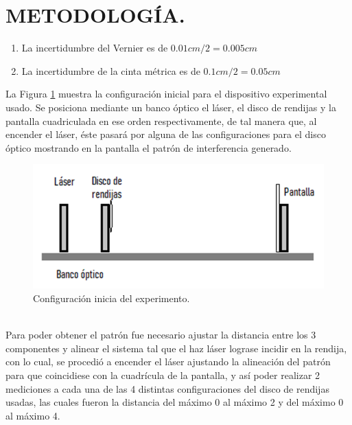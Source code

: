 \documentclass[12pt,a4paper]{article}
\begin{document}
\section{METODOLOGÍA.} %
\begin{enumerate}[noitemsep]
	\item La incertidumbre del Vernier es de $ 0.01cm/2=0.005 cm $
	\item La incertidumbre de la cinta métrica es de $ 0.1cm/2=0.05 cm $
\end{enumerate}
La Figura \ref{fig:conf_inicial} muestra la configuración inicial para el dispositivo experimental usado.
Se posiciona mediante un banco óptico el láser, el disco de rendijas y la pantalla cuadriculada en ese orden respectivamente, de tal manera que, al encender el láser, éste pasará por alguna de las configuraciones para el disco óptico mostrando en la pantalla el patrón de interferencia generado.
\begin{figure}[hbtp!]
	\centering
	\includegraphics[width= 0.7 \linewidth]{2_METODO/image}
	\caption{Configuración inicia del experimento.}
	\label{fig:conf_inicial}
\end{figure}\\
Para poder obtener el patrón fue necesario ajustar la distancia entre los 3 componentes y alinear el sistema tal que el haz láser lograse incidir en la rendija, con lo cual, se procedió a encender el láser ajustando la alineación del patrón para que coincidiese con la cuadrícula de la pantalla, y así poder realizar 2 mediciones a cada una de las 4 distintas configuraciones del disco de rendijas usadas, las cuales fueron la distancia del máximo 0 al máximo 2 y del máximo 0 al máximo 4.
\end{document}
